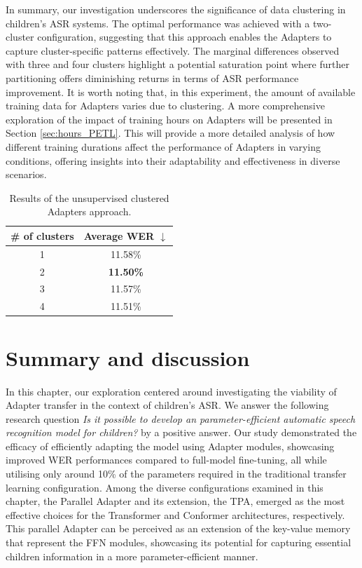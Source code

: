 In summary, our investigation underscores the significance of data clustering in children's \ac{ASR} systems. The optimal performance was achieved with a two-cluster configuration, suggesting that this approach enables the Adapters to capture cluster-specific patterns effectively. The marginal differences observed with three and four clusters highlight a potential saturation point where further partitioning offers diminishing returns in terms of \ac{ASR} performance improvement. It is worth noting that, in this experiment, the amount of available training data for Adapters varies due to clustering. A more comprehensive exploration of the impact of training hours on Adapters will be presented in Section \ref{sec:hours_PETL}. This will provide a more detailed analysis of how different training durations affect the performance of Adapters in varying conditions, offering insights into their adaptability and effectiveness in diverse scenarios.

\begin{table}[t]
    \begin{center}    
    \begin{tabular}{cc}
    \hline
      \# of clusters & Average WER $\downarrow$    \\ \hline
    \multicolumn{1}{c}{1} & 11.58\%  \\%
    \multicolumn{1}{c}{2} & \textbf{11.50\%}  \\
    \multicolumn{1}{c}{3} & 11.57\%  \\
    \multicolumn{1}{c}{4} & 11.51\%  \\ \hline 
    \end{tabular}
    \end{center}
    \caption{Results of the unsupervised clustered Adapters approach.}
    \label{tab:res_clusters}
    \end{table}
    
\section{Summary and discussion}
In this chapter, our exploration centered around investigating the viability of Adapter transfer in the context of children's \ac{ASR}. We answer the following research question \textit{Is it possible to develop an parameter-efficient automatic speech recognition model for children?} by a positive answer. Our study demonstrated the efficacy of efficiently adapting the model using Adapter modules, showcasing improved \ac{WER} performances compared to full-model fine-tuning, all while utilising only around 10\% of the parameters required in the traditional transfer learning configuration. Among the diverse configurations examined in this chapter, the Parallel Adapter and its extension, the \ac{TPA}, emerged as the most effective choices for the Transformer and Conformer architectures, respectively. This parallel Adapter can be perceived as an extension of the key-value memory that represent the \ac{FFN} modules, showcasing its potential for capturing essential children information in a more parameter-efficient manner.

